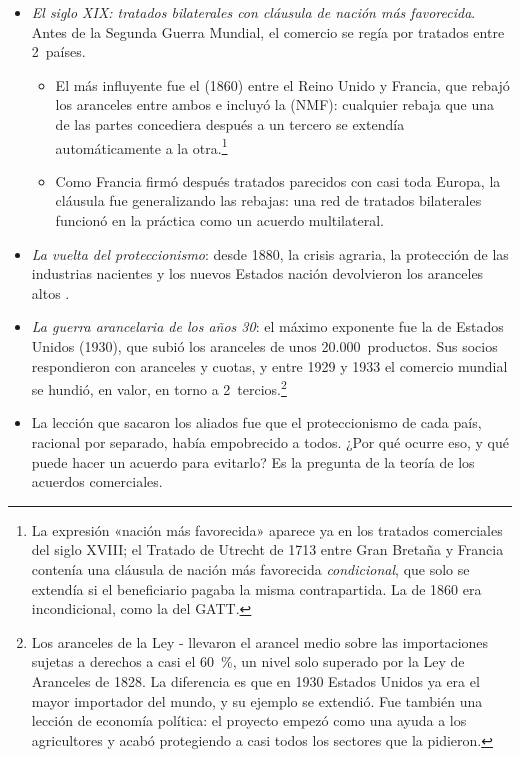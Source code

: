 \documentclass[11pt]{article}
\begin{document}
\begin{itemize}
\item \emph{El siglo XIX: tratados bilaterales con cláusula de nación más favorecida}. Antes de la Segunda Guerra Mundial, el comercio se regía por tratados entre 2~países.
  \begin{itemize}
  \item El más influyente fue el  (1860) entre el Reino Unido y Francia, que rebajó los aranceles entre ambos e incluyó la  (NMF): cualquier rebaja que una de las partes concediera después a un tercero se extendía automáticamente a la otra.\footnote{La expresión «nación más favorecida» aparece ya en los tratados comerciales del siglo XVIII; el Tratado de Utrecht de 1713 entre Gran Bretaña y Francia contenía una cláusula de nación más favorecida \emph{condicional}, que solo se extendía si el beneficiario pagaba la misma contrapartida. La de 1860 era incondicional, como la del GATT.}
  \item Como Francia firmó después tratados parecidos con casi toda Europa, la cláusula fue generalizando las rebajas: una red de tratados bilaterales funcionó en la práctica como un acuerdo multilateral.
  \end{itemize}
\item \emph{La vuelta del proteccionismo}: desde 1880, la crisis agraria, la protección de las industrias nacientes y los nuevos Estados nación devolvieron los aranceles altos\nocite{Comin2014Historia} .
\item \emph{La guerra arancelaria de los años 30}: el máximo exponente fue la  de Estados Unidos (1930), que subió los aranceles de unos 20.000~productos. Sus socios respondieron con aranceles y cuotas, y entre 1929 y 1933 el comercio mundial se hundió, en valor, en torno a 2~tercios.\footnote{Los aranceles de la Ley - llevaron el arancel medio sobre las importaciones sujetas a derechos a casi el 60~\%, un nivel solo superado por la Ley de Aranceles de 1828. La diferencia es que en 1930 Estados Unidos ya era el mayor importador del mundo, y su ejemplo se extendió. Fue también una lección de economía política: el proyecto empezó como una ayuda a los agricultores y acabó protegiendo a casi todos los sectores que la pidieron\nocite{Irwin2017Clashing}.}
\item La lección que sacaron los aliados fue que el proteccionismo de cada país, racional por separado, había empobrecido a todos. ¿Por qué ocurre eso, y qué puede hacer un acuerdo para evitarlo? Es la pregunta de la teoría de los acuerdos comerciales.
\end{itemize}
\end{document}

